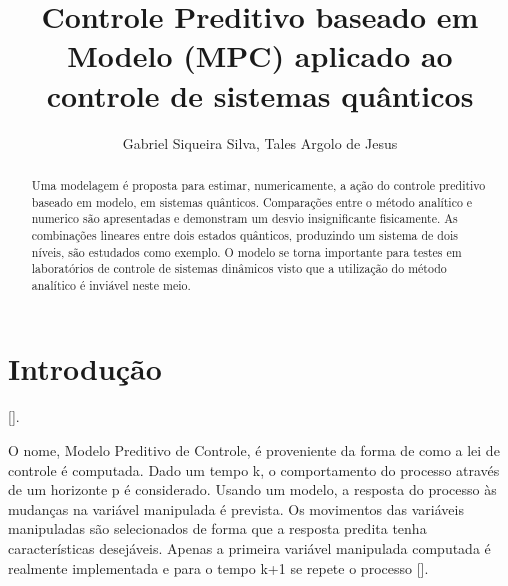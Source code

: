 \documentclass[10pt,aps,prb,twocolumn, nofootinbib]{revtex4-1}
\begin{document}


\title{Controle Preditivo baseado em Modelo (MPC) aplicado ao controle de sistemas quânticos}
\author{Gabriel Siqueira Silva, Tales Argolo de Jesus}

\begin{abstract}

Uma modelagem é proposta para estimar, numericamente, a ação do controle preditivo baseado em modelo, em sistemas quânticos. Comparações entre o método analítico e numerico são apresentadas e demonstram um desvio insignificante fisicamente. As combinações lineares entre dois estados quânticos, produzindo um sistema de dois níveis, são estudados como exemplo. O modelo se torna importante para testes em laboratórios de controle de sistemas dinâmicos visto que a utilização do método analítico é inviável neste meio.

\end{abstract}

\maketitle
\section{\label{sec:one}Introdução}

[].

O nome, Modelo Preditivo de Controle, é proveniente da forma de como a lei de controle é computada. Dado um tempo k, o comportamento do processo através de um horizonte p é considerado. Usando um modelo, a resposta do processo às mudanças na variável manipulada é prevista. Os movimentos das variáveis manipuladas são selecionados de forma que a resposta predita tenha características desejáveis. Apenas a primeira variável manipulada computada é realmente implementada e para o tempo k+1 se repete o processo [].
\end{document}
